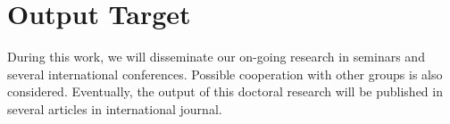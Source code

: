 
\section{Output Target}

During this work, we will disseminate our on-going research in seminars and several international conferences. Possible cooperation with other groups is also considered. Eventually, the output of this doctoral research will be published in several articles in international journal.


\cleardoublepage
